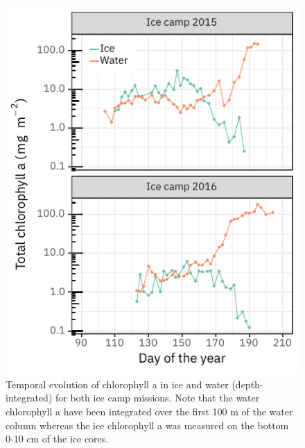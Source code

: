 \documentclass[12pt,a4paper]{scrartcl}
\begin{document}
\begin{figure}[h]
	\centering
	\includegraphics[scale = 2]{../../../graphs/fig7.pdf}
	\caption{Temporal evolution of chlorophyll a in ice and water (depth-integrated) for both ice camp missions. Note that the water chlorophyll a have been integrated over the first 100 m of the water column whereas the ice chlorophyll a was measured on the bottom 0-10 cm of the ice cores.}
\end{figure}
\end{document}
